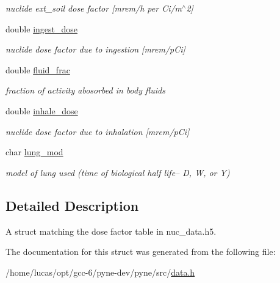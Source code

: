 \begin{DoxyCompactItemize}
\begin{DoxyCompactList}\small\item\em nuclide ext\+\_\+soil dose factor \mbox{[}mrem/h per Ci/m$^\wedge$2\mbox{]} \end{DoxyCompactList}\item 
double \hyperlink{structpyne_1_1dose_a96dc0ff17888672afb40c82b3c6bb996}{ingest\+\_\+dose}\hypertarget{structpyne_1_1dose_a96dc0ff17888672afb40c82b3c6bb996}{}\label{structpyne_1_1dose_a96dc0ff17888672afb40c82b3c6bb996}

\begin{DoxyCompactList}\small\item\em nuclide dose factor due to ingestion \mbox{[}mrem/p\+Ci\mbox{]} \end{DoxyCompactList}\item 
double \hyperlink{structpyne_1_1dose_ac5aad706f373cee64e286f6191f753c2}{fluid\+\_\+frac}\hypertarget{structpyne_1_1dose_ac5aad706f373cee64e286f6191f753c2}{}\label{structpyne_1_1dose_ac5aad706f373cee64e286f6191f753c2}

\begin{DoxyCompactList}\small\item\em fraction of activity abosorbed in body fluids \end{DoxyCompactList}\item 
double \hyperlink{structpyne_1_1dose_ade66b3422bf24883142e0de856d67228}{inhale\+\_\+dose}\hypertarget{structpyne_1_1dose_ade66b3422bf24883142e0de856d67228}{}\label{structpyne_1_1dose_ade66b3422bf24883142e0de856d67228}

\begin{DoxyCompactList}\small\item\em nuclide dose factor due to inhalation \mbox{[}mrem/p\+Ci\mbox{]} \end{DoxyCompactList}\item 
char \hyperlink{structpyne_1_1dose_afc70c9461a6c1e3348a90e66747db41e}{lung\+\_\+mod}\hypertarget{structpyne_1_1dose_afc70c9461a6c1e3348a90e66747db41e}{}\label{structpyne_1_1dose_afc70c9461a6c1e3348a90e66747db41e}

\begin{DoxyCompactList}\small\item\em model of lung used (time of biological half life-- D, W, or Y) \end{DoxyCompactList}\end{DoxyCompactItemize}


\subsection{Detailed Description}
A struct matching the dose factor table in nuc\+\_\+data.\+h5. 

The documentation for this struct was generated from the following file\+:\begin{DoxyCompactItemize}
\item 
/home/lucas/opt/gcc-\/6/pyne-\/dev/pyne/src/\hyperlink{data_8h}{data.\+h}\end{DoxyCompactItemize}
